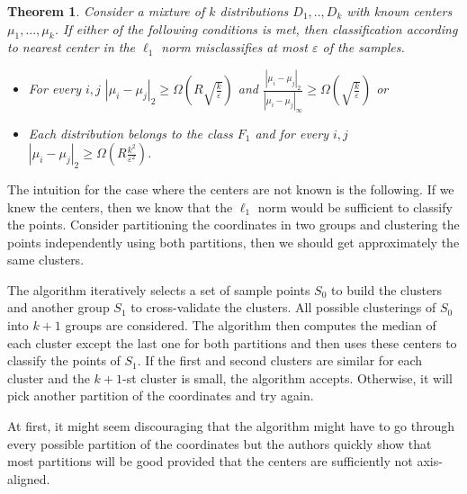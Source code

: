 \documentclass[11pt,letter]{article}
\newtheorem{theorem}{Theorem}
\begin{document}
\begin{theorem}
Consider a mixture of $k$ distributions $D_1,..,D_k$ with known centers $\mu_1,...,\mu_k$. If either of the following conditions is met, then classification according to nearest center in the $\ell_1$ norm misclassifies at most $\varepsilon$ of the samples.

\begin{itemize}
	\item For every $i, j$ $|\mu_i - \mu_j|_2 \geq \Omega\left( R \sqrt{\frac{k}{\varepsilon}}\right)$ and $\frac{|\mu_i - \mu_j|_2}{|\mu_i - \mu_j|_\infty} \geq \Omega \left( \sqrt{\frac{k}{\varepsilon}}\right)$ or
	\item Each distribution belongs to the class $F_1$ and for every $i, j$ $|\mu_i - \mu_j|_2 \geq \Omega\left(R\frac{k^2}{\varepsilon^2}\right)$.
	
\end{itemize}
\end{theorem}

The intuition for the case where the centers are not known is the following. If we knew the centers, then we know that the $\ell_1$ norm would be sufficient to classify the points. Consider partitioning the coordinates in two groups and clustering the points independently using both partitions, then we should get approximately the same clusters. 

The algorithm iteratively selects a set of sample points $S_0$ to build the clusters and another group $S_1$ to cross-validate the clusters. All possible clusterings of $S_0$ into $k+1$ groups are considered. The algorithm then computes the median of each cluster except the last one for both partitions and then uses these centers to classify the points of $S_1$. If the first and second clusters are similar for each cluster and the $k+1$-st cluster is small, the algorithm accepts. Otherwise, it will pick another partition of the coordinates and try again.  

At first, it might seem discouraging that the algorithm might have to go through every possible partition of the coordinates but the authors quickly show that most partitions will be good provided that the centers are sufficiently not axis-aligned. 



 
 
\end{document}
